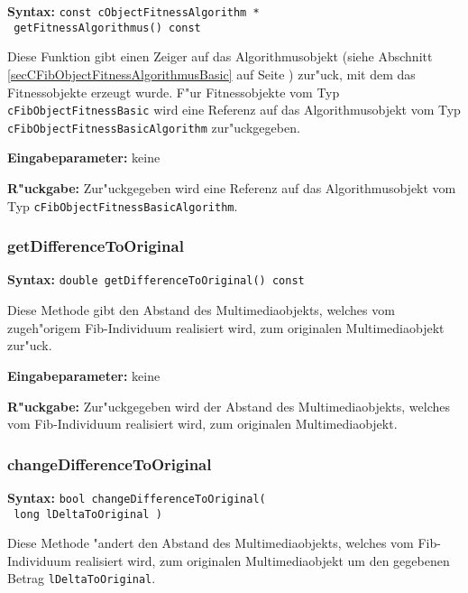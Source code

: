 \textbf{Syntax:} \verb|const cObjectFitnessAlgorithm * | \\\verb| getFitnessAlgorithmus() const|

\bigskip\noindent
Diese Funktion gibt einen Zeiger auf das Algorithmusobjekt (siehe Abschnitt \ref{secCFibObjectFitnessAlgorithmusBasic} auf Seite \pageref{secCFibObjectFitnessAlgorithmusBasic}) zur"uck, mit dem das Fitnessobjekte erzeugt wurde. F"ur Fitnessobjekte vom Typ \verb|cFibObjectFitnessBasic| wird eine Referenz auf das Algorithmusobjekt vom Typ \verb|cFibObjectFitnessBasicAlgorithm| zur"uckgegeben.

\bigskip\noindent
\textbf{Eingabeparameter:} keine

\bigskip\noindent
\textbf{R"uckgabe:} Zur"uckgegeben wird eine Referenz auf das Algorithmusobjekt vom Typ \verb|cFibObjectFitnessBasicAlgorithm|.


\subsubsection{getDifferenceToOriginal}

\textbf{Syntax:} \verb|double getDifferenceToOriginal() const|

\bigskip\noindent
Diese Methode gibt den Abstand des Multimediaobjekts, welches vom zugeh"origem Fib-Individuum realisiert wird, zum originalen Multimediaobjekt zur"uck.

\bigskip\noindent
\textbf{Eingabeparameter:} keine

\bigskip\noindent
\textbf{R"uckgabe:} Zur"uckgegeben wird der Abstand des Multimediaobjekts, welches vom Fib-Individuum realisiert wird, zum originalen Multimediaobjekt.


\subsubsection{changeDifferenceToOriginal}

\textbf{Syntax:} \verb|bool changeDifferenceToOriginal(| \\\verb| long lDeltaToOriginal )|

\bigskip\noindent
Diese Methode "andert den Abstand des Multimediaobjekts, welches vom Fib-Individuum realisiert wird, zum originalen Multimediaobjekt um den gegebenen Betrag \verb|lDeltaToOriginal|.

